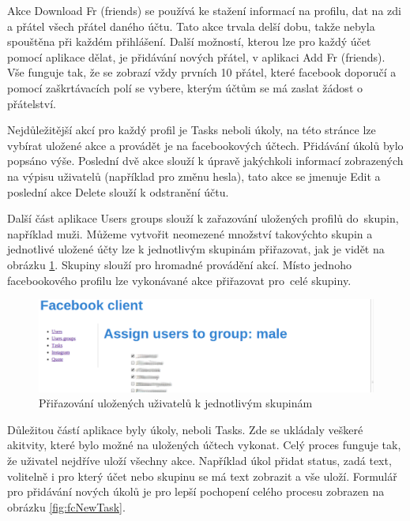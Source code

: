 \documentclass[thesis=M,czech]{FITthesis}[2013/05/10]
\begin{document}
Akce Download Fr (friends) se používá ke stažení informací na profilu, dat na zdi a přátel všech přátel daného účtu. Tato akce trvala delší dobu, takže nebyla spouštěna při každém přihlášení. Další možností, kterou lze pro každý účet pomocí aplikace dělat, je přidávání nových přátel, v aplikaci Add Fr (friends). Vše funguje tak, že se zobrazí vždy prvních 10 přátel, které facebook doporučí a pomocí zaškrtávacích polí se vybere, kterým účtům se má zaslat žádost o přátelství.

Nejdůležitější akcí pro každý profil je Tasks neboli úkoly, na této stránce lze vybírat uložené akce a provádět je na facebookových účtech. Přidávání úkolů bylo popsáno výše. Poslední dvě akce slouží k úpravě jakýchkoli informací  zobrazených na výpisu uživatelů (například pro změnu hesla), tato akce se jmenuje Edit a poslední akce Delete slouží k odstranění účtu.

Další část aplikace Users groups slouží k zařazování uložených profilů do~skupin, například muži. Můžeme vytvořit neomezené množství takovýchto skupin a jednotlivé uložené účty lze k jednotlivým skupinám přiřazovat, jak je vidět na obrázku \ref{fig:fcAssignGroup}. Skupiny slouží pro hromadné provádění akcí. Místo jednoho facebookového profilu lze vykonávané akce přiřazovat pro~celé skupiny.

\begin{figure}[h]
\begin{center}
\includegraphics[width=5in]{figures/fcAssignGroup.png}
\caption{Přiřazování uložených uživatelů k jednotlivým skupinám}
\label{fig:fcAssignGroup}
\end{center}
\end{figure}

Důležitou částí aplikace byly úkoly, neboli Tasks. Zde se ukládaly veškeré akitvity, které bylo možné na uložených účtech vykonat. Celý proces funguje tak, že uživatel nejdříve uloží všechny akce. Například úkol přidat status, zadá text, volitelně i pro který účet nebo skupinu se má text zobrazit a vše uloží. Formulář pro přidávání nových úkolů je pro lepší pochopení celého procesu zobrazen na obrázku \ref{fig:fcNewTask}.
\end{document}
